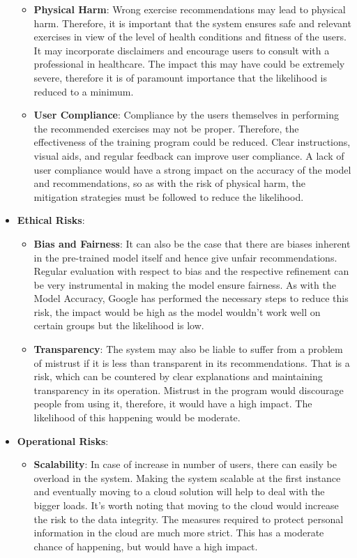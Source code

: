 \begin{itemize}
            \begin{itemize}
                \item \textbf{Physical Harm}: Wrong exercise recommendations may lead to physical harm. Therefore, it is important that the system ensures safe and relevant exercises in view of the level of health conditions and fitness of the users. It may incorporate disclaimers and encourage users to consult with a professional in healthcare. The impact this may have could be extremely severe,  therefore it is of paramount importance that the likelihood is reduced to a minimum.
                \item \textbf{User Compliance}: Compliance by the users themselves in performing the recommended exercises may not be proper. Therefore, the effectiveness of the training program could be reduced. Clear instructions, visual aids, and regular feedback can improve user compliance. A lack of user compliance would have a strong impact on the accuracy of the model and recommendations, so as with the risk of physical harm, the mitigation strategies must be followed to reduce the likelihood.
            \end{itemize}
        \item \textbf{Ethical Risks}:
            \begin{itemize}
                \item \textbf{Bias and Fairness}: It can also be the case that there are biases inherent in the pre-trained model itself and hence give unfair recommendations. Regular evaluation with respect to bias and the respective refinement can be very instrumental in making the model ensure fairness. As with the Model Accuracy, Google has performed the necessary steps to reduce this risk, the impact would be high as the model wouldn't work well on certain groups but the likelihood is low.
                \item \textbf{Transparency}: The system may also be liable to suffer from a problem of mistrust if it is less than transparent in its recommendations. That is a risk, which can be countered by clear explanations and maintaining transparency in its operation. Mistrust in the program would discourage people from using it, therefore, it would have a high impact. The likelihood of this happening would be moderate.
            \end{itemize}
        \item \textbf{Operational Risks}:
            \begin{itemize}
                \item \textbf{Scalability}: In case of increase in number of users, there can easily be overload in the system. Making the system scalable at the first instance and eventually moving to a cloud solution will help to deal with the bigger loads. It's worth noting that moving to the cloud would increase the risk to the data integrity. The measures required to protect personal information in the cloud are much more strict. This has a moderate chance of happening, but would have a high impact.

\end{itemize}
\end{itemize}
